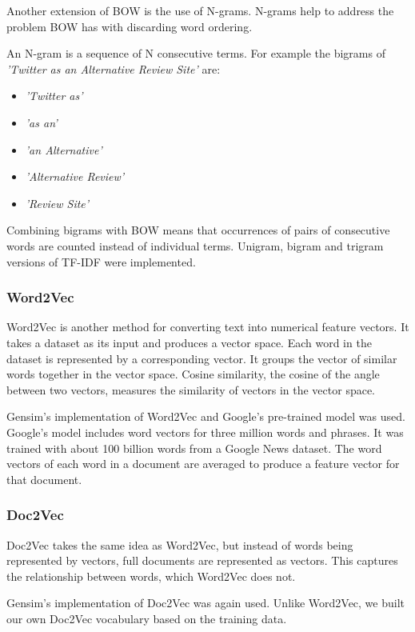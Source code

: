 Another extension of BOW is the use of N-grams. N-grams help to address the problem BOW has with discarding word ordering.

An N-gram is a sequence of N consecutive terms. For example the bigrams of \emph{'Twitter as an Alternative Review Site'} are:
\begin{itemize}
    \item \emph{'Twitter as'}
    \item \emph{'as an'}
    \item \emph{'an Alternative'}
    \item \emph{'Alternative Review'}
    \item \emph{'Review Site'}
\end{itemize}

Combining bigrams with BOW means that occurrences of pairs of consecutive words are counted instead of individual terms. Unigram, bigram and trigram versions of TF-IDF were implemented.

\subsubsection{Word2Vec}

Word2Vec is another method for converting text into numerical feature vectors. It takes a dataset as its input and produces a vector space. Each word in the dataset is represented by a corresponding vector. It groups the vector of similar words together in the vector space. Cosine similarity, the cosine of the angle between two vectors, measures the similarity of vectors in the vector space. 

Gensim's implementation of Word2Vec \cite{gensim} and Google's pre-trained model was used. Google's model includes word vectors for three million words and phrases. It was trained with about 100 billion words from a Google News dataset. The word vectors of each word in a document are averaged to produce a feature vector for that document.

\subsubsection*{Doc2Vec}

Doc2Vec takes the same idea as Word2Vec, but instead of words being represented by vectors, full documents are represented as vectors. This captures the relationship between words, which Word2Vec does not.

Gensim's implementation of Doc2Vec was again used. Unlike Word2Vec, we built our own Doc2Vec vocabulary based on the training data.

